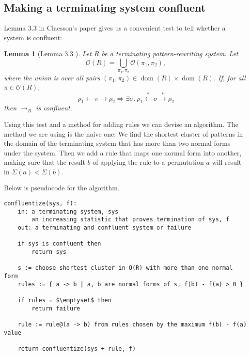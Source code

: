 \documentclass[a4paper, 11pt, english]{article}
\newtheorem{lemma}[theorem]{Lemma}
\theoremstyle{definition}
\newcommand{\Ocal}{\mathcal{O}}
\newcommand{\from}{\leftarrow}
\newcommand{\tostar}{\stackrel{*}{\to}}
\newcommand{\fromstar}{\stackrel{*}{\from}}
\DeclareMathOperator{\dom}{dom}
\begin{document}
\subsection{Making a terminating system confluent}
Lemma $3.3$ in Claesson's paper gives us a convenient test to tell whether a system is
confluent:
\begin{lemma}[Lemma 3.3 \cite{claesson:2021}]
    Let $R$ be a terminating pattern-rewriting system. Let 
    \begin{equation*}
        \Ocal(R) = \bigcup_{\pi_1, \pi_2} \Ocal(\pi_1, \pi_2),
    \end{equation*}
    where the union is over all pairs $(\pi_1, \pi_2) \in \dom(R) \times \dom(R)$. If, for all
    $\pi \in \Ocal(R)$,
    \begin{equation*}
        \rho_1 \from \pi \to \rho_2 \Longrightarrow \exists \sigma . \ \rho_1 \fromstar \sigma \tostar
        \rho_2 
    \end{equation*}
    then $\to_R$ is confluent.
\end{lemma}
Using this test and a method for adding rules we can devise an algorithm. The method we are using is the
naive one: We find the shortest cluster of patterns in the domain of the terminating system that has more than two
normal forms under the system. Then we add a rule that maps one normal form into another, making
sure that the result $b$ of applying the rule to a permutation $a$ will result in $\Sigma(a) <
\Sigma(b)$.

Below is pseudocode for the algorithm.

\lstset{basicstyle=\footnotesize\ttfamily, frame=single, breaklines=true,
mathescape=true}
\begin{minipage}{\linewidth}
\begin{lstlisting}[title={Algorithm 1}]
confluentize(sys, f):
    in: a terminating system, sys
        an increasing statistic that proves termination of sys, f
    out: a terminating and confluent system or failure

    if sys is confluent then
        return sys

    s := choose shortest cluster in O(R) with more than one normal form
    rules := { a -> b | a, b are normal forms of s, f(b) - f(a) > 0 }

    if rules = $\emptyset$ then
        return failure

    rule := rule@(a -> b) from rules chosen by the maximum f(b) - f(a) value

    return confluentize(sys + rule, f)
\end{lstlisting}
\end{minipage}
\end{document}
